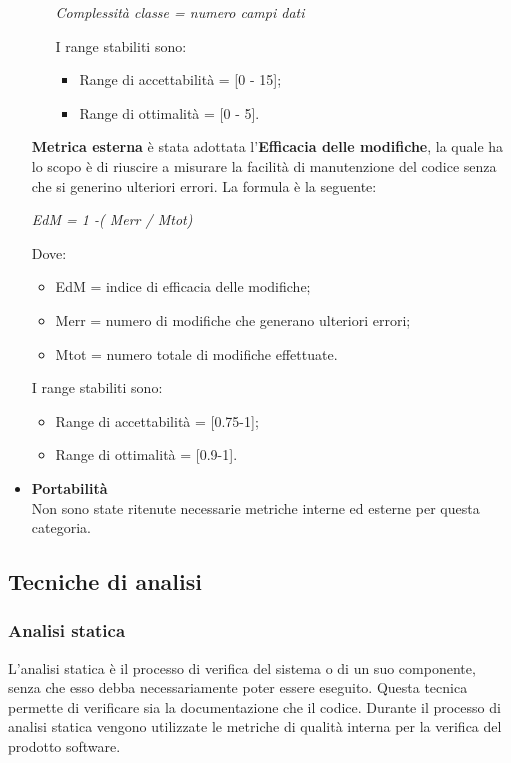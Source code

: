 \begin{itemize}
\begin{itemize}
            \begin{center}
              \emph{Complessità classe = numero campi dati}
            \end{center}
            I range stabiliti sono:
            \begin{itemize}
              \item Range di accettabilità = [0 - 15];
              \item Range di ottimalità = [0 - 5].
            \end{itemize}
        \end{itemize}
        \textbf{Metrica esterna} è stata adottata l'\textbf{Efficacia delle modifiche},
        la quale ha lo scopo è di riuscire a misurare la facilità di manutenzione del codice senza che si generino ulteriori errori.
        La formula è la seguente:
        \begin{center}
          \emph{EdM = 1 -( Merr / Mtot)}
        \end{center}
        Dove:
        \begin{itemize}
          \item EdM = indice di efficacia delle modifiche;
          \item Merr = numero di modifiche che generano ulteriori errori;
          \item Mtot = numero totale di modifiche effettuate.
        \end{itemize}
        I range stabiliti sono:
        \begin{itemize}
          \item Range di accettabilità = [0.75-1];
          \item Range di ottimalità = [0.9-1].
        \end{itemize}
      \item \textbf{Portabilità}\\
      Non sono state ritenute necessarie metriche interne ed esterne per questa categoria.
    \end{itemize}



  \subsection{Tecniche di analisi}
    \subsubsection{Analisi statica}
    L'analisi statica è il processo di verifica del sistema o di un suo componente, senza che esso debba necessariamente poter essere eseguito.
    Questa tecnica permette di verificare sia la documentazione che il codice.
    Durante il processo di analisi statica vengono utilizzate le metriche di qualità interna per la verifica del prodotto software.
